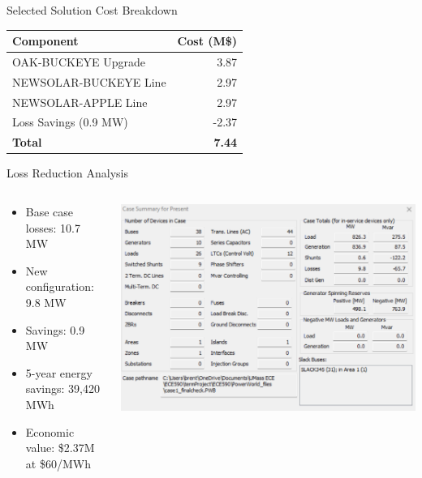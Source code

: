 \documentclass{beamer}
\begin{document}
	\begin{frame}{Selected Solution Cost Breakdown}
		\begin{table}
			\centering
			\begin{tabular}{|l|r|}
				\hline
				\textbf{Component} & \textbf{Cost (M\$)} \\
				\hline
				OAK-BUCKEYE Upgrade & 3.87 \\
				NEWSOLAR-BUCKEYE Line & 2.97 \\
				NEWSOLAR-APPLE Line & 2.97 \\
				Loss Savings (0.9 MW) & -2.37 \\
				\hline
				\textbf{Total} & \textbf{7.44} \\
				\hline
			\end{tabular}
		\end{table}
	\end{frame}
	
	\begin{frame}{Loss Reduction Analysis}
		\begin{columns}[T]
			\begin{column}{0.4\textwidth}
				\begin{itemize}
					\item Base case losses: 10.7 MW
					\item New configuration: 9.8 MW
					\item Savings: 0.9 MW
					\item 5-year energy savings: 39,420 MWh
					\item Economic value: \$2.37M at \$60/MWh
				\end{itemize}
			\end{column}
			\begin{column}{0.6\textwidth}
				\includegraphics[width=1\linewidth]{figures/case1loss}
			\end{column}
		\end{columns}
	\end{frame}
	
\end{document}
